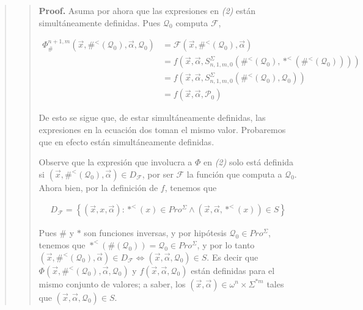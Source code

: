 \documentclass[a4paper, 12pt]{article}
\begin{document}
\begin{quote}
    \begin{quote}
        \textbf{Proof.} Asuma por ahora que las expresiones en \textit{(2)}
        están simultáneamente definidas. Pues $\mathcal{Q}_0$ computa
        $\mathscr{F}$,

    \begin{align*}
            \Phi_{\#}^{n+1, m}\left( \vec{x}, \#^{<}\left(\mathcal{Q}_0 \right),
            \vec{\alpha}, \mathcal{Q}_0\right) &=
            \mathscr{F}\left( \vec{x}, \#^< \left( \mathcal{Q}_0 \right),
            \vec{\alpha} \right) \\
            &=  f\left(\vec{x}, \vec{\alpha}, S_{n, 1, m, 0}^{\Sigma}\left(
            \#^{<}(\mathcal{Q}_0), *^<\left( \#^< \left( \mathcal{Q}_0 \right)
        \right)  \right) \right) \\ 
            &=  f\left(\vec{x}, \vec{\alpha}, S_{n, 1, m, 0}^{\Sigma}\left(
            \#^{<}(\mathcal{Q}_0), \mathcal{Q}_0 \right) \right) \\ 
            &=  f\left(\vec{x}, \vec{\alpha}, \mathcal{P}_0\right)
    \end{align*}

    De esto se sigue que, de estar simultáneamente definidas, las expresiones en
    la ecuación dos toman el mismo valor. Probaremos que en efecto están
    simultáneamente definidas.

    Observe que la expresión que involucra a $\Phi$ en \textit{(2)} solo está
    definida si $(\vec{x}, \#^<(\mathcal{Q}_0), \vec{\alpha}) \in
    D_{\mathscr{F}}$, por ser $\mathscr{F}$ la función que computa a
    $\mathcal{Q}_0$. Ahora bien, por la definición de
    $f$, tenemos que

    \begin{align*}
        D_{\mathscr{F}} = \left\{ (\vec{x}, x, \vec{\alpha}) : *^<(x) \in
        Pro^{\Sigma} \land (\vec{x}, \vec{\alpha}, *^<(x)) \in S  \right\} 
    \end{align*}

    Pues $\#$ y $*$ son funciones inversas, y por hipótesis $\mathcal{Q}_0 \in
    Pro^{\Sigma}$, tenemos que $*^<(\#(\mathcal{Q}_0)) = \mathcal{Q}_0 \in
    Pro^{\Sigma}$, y por lo tanto $(\vec{x}, \#^<(\mathcal{Q}_0), \vec{\alpha})
    \in D_{\mathscr{F}} \iff (\vec{x}, \vec{\alpha}, \mathcal{Q}_0) \in S$. Es
    decir que $\Phi(\vec{x}, \#^<(\mathcal{Q}_0), \vec{\alpha}, \mathcal{Q}_0)$
    y $f(\vec{x}, \vec{\alpha}, \mathcal{Q}_0)$ están definidas para el mismo
    conjunto de valores; a saber, los $(\vec{x}, \vec{\alpha}) \in \omega^{n}
    \times \Sigma^{*m} $ tales que $(\vec{x}, \vec{\alpha}, \mathcal{Q}_0) \in S
    $.




\end{quote}
\end{quote}
\end{document}
